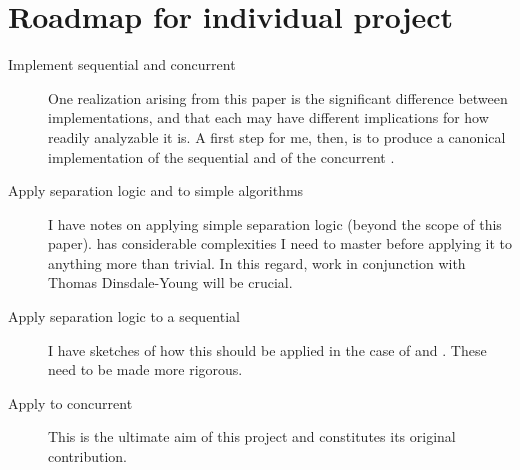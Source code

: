 \section{Roadmap for individual project}

\begin{description}

\item[Implement sequential and concurrent \RBt]
One realization arising from this paper is
  the significant difference between implementations,
  and that each may have different implications for how readily analyzable it is.
A first step for me, then,
  is to produce a canonical implementation
    of the sequential \RBt and of the concurrent \RBt.

\item[Apply separation logic and \CAP to simple algorithms]
I have notes on applying simple separation logic
  (beyond the scope of this paper).
\CAP has considerable complexities I need to master
  before applying it to anything more than trivial.
In this regard,
  work in conjunction with Thomas Dinsdale-Young will be crucial.

\item[Apply separation logic to a sequential \RBt]
I have sketches of how this should be applied
  in the case of  and .
These need to be made more rigorous.

\item[Apply \CAP to concurrent \RBt]
This is the ultimate aim of this project
  and constitutes its original contribution.

\end{description}
